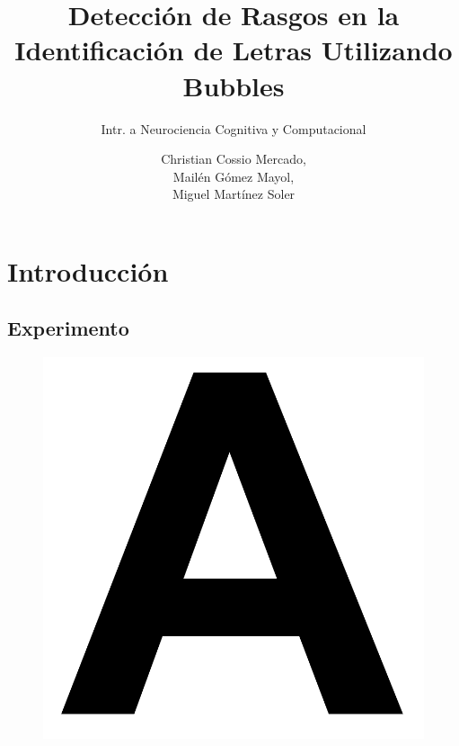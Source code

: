 \documentclass{beamer}
\title{Detecci\'on de Rasgos en la Identificaci\'on de Letras Utilizando Bubbles}
\subtitle{Intr. a Neurociencia Cognitiva y Computacional}
\author[Martinez Soler,\\Gomez Mayol,\\Cossio Mercado]{Christian Cossio Mercado,\\Mail\'en G\'omez Mayol,\\Miguel Mart\'inez Soler}
\institute{Departamento de Computaci\'on - FCEyN, UBA}
\begin{document}
\begin{frame}
 \titlepage
\end{frame}

\section{Introducci\'on}
\subsection{Experimento}

\begin{frame}
 \begin{figure}
  \includegraphics[scale=.2]{graficos/letra.png}
 \end{figure}
\end{frame}
\end{document}
